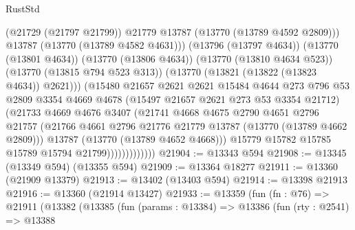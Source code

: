\begin{lexlean}{RustStd}
\begin{coremodule}
                                (@21729 (@21797 @21799))
                                @21779
                                @13787
                                (@13770 (@13789 @4592 @2809)))
                              @13787
                              (@13770 (@13789 @4582 @4631)))
                            (@13796 (@13797 @4634))
                            (@13770 (@13801 @4634))
                            (@13770 (@13806 @4634))
                            (@13770 (@13810 @4634 @523))
                            (@13770 (@13815 @794 @523 @313))
                            (@13770 (@13821 (@13822 (@13823 @4634)) @2621)))
                          (@15480
                            @21657
                            @2621
                            @2621
                            @15484
                            @4644
                            @273
                            @796
                            @53
                            @2809
                            @3354
                            @4669
                            @4678
                            (@15497 @21657 @2621 @273 @53 @3354 @21712)
                            (@21733
                              @4669
                              @4676
                              @3407
                              (@21741
                                @4668
                                @4675
                                @2790
                                @4651
                                @2796
                                @21757
                                (@21766
                                  @4661
                                  @2796
                                  @21776
                                  @21779
                                  @13787
                                  (@13770 (@13789 @4662 @2809)))
                                @13787
                                (@13770 (@13789 @4652 @4668)))
                              @15779
                              @15782
                              @15785
                              @15789
                              @15794
                              @21799)))))))))))))
@21904 := @13343 @594
@21908 := @13345 (@13349 @594) (@13355 @594)
@21909 := @13364 @18277
@21911 := @13360 (@21909 @13379)
@21913 := @13402 (@13403 @594)
@21914 := @13398 @21913
@21916 := @13360 (@21914 @13427)
@21933 := @13359
    (fun (fn : @76) =>
    @21911
      (@13382
        (@13385
          (fun (params : @13384) =>
          @13386
            (fun (rty : @2541) =>
            @13388

\end{coremodule}
\end{lexlean}
